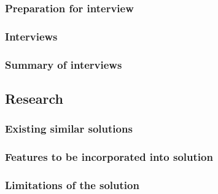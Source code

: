 \documentclass[11pt,a4paper]{article}
\begin{document}
\subsubsection{Preparation for interview}


\subsubsection{Interviews}

\begin{comment}
2 or 3

person
question
answer
brief summary
\end{comment}

\subsubsection{Summary of interviews}

\begin{comment}
half a page of key things that were found out from the interviews
should include / should not include / etc.


\end{comment}

\pagebreak

\subsection{Research}


\subsubsection{Existing similar solutions}


\subsubsection{Features to be incorporated into solution}

\begin{comment}
based on research etc
select the features from the research that will be incorporated
and explain what they do
from sortly, steal x feature because y
include things you won't include as well (out of scope), because xyz
\end{comment}

\subsubsection{Limitations of the solution}
\end{document}
